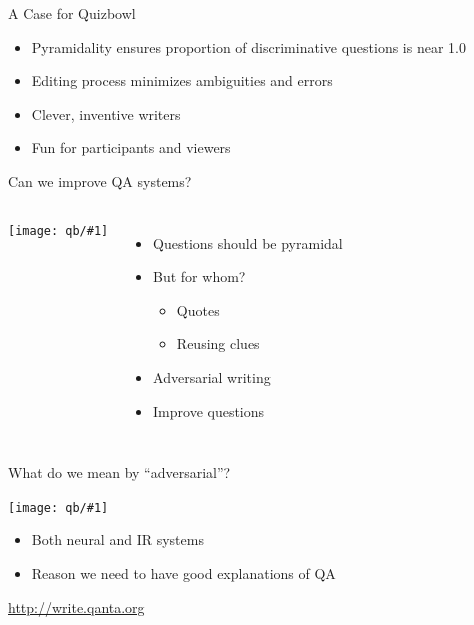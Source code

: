 \documentclass[xcolor=dvipsnames,xcolor=table]{beamer}
\newcommand{\fsi}[2]{
\begin{frame}[plain]
\vspace*{-1pt}
\makebox[\linewidth]{\texttt{[image: \#1]}}
\begin{center}
#2
\end{center}
\end{frame}
}
\newcommand{\gfxq}[2]{
\begin{center}
	\texttt{[image: qb/\#1]}
\end{center}
}
\begin{document}
\begin{frame}{A Case for Quizbowl}

  \begin{itemize}
    \item Pyramidality ensures proportion of discriminative questions is near 1.0
    \item Editing process minimizes ambiguities and errors
    \item Clever, inventive writers
    \item Fun for participants and viewers
  \end{itemize}
\end{frame}


\fsi{qb/jennings_handshake}{}

\begin{frame}{Can we improve QA systems?}

\begin{columns}
     \gfxq{trick/pyramid}{.9}
     \begin{itemize}
       \item Questions should be pyramidal
       \item But for whom?
         \begin{itemize}
           \item Quotes
           \item Reusing clues
         \end{itemize}
         \item Adversarial writing
         \item Improve questions
     \end{itemize}
\end{columns}
\end{frame}

\begin{frame}{What do we mean by ``adversarial''?}

  \gfxq{trick/flow_chart_horizontal_label}{1.0}

  \begin{itemize}
    \item Both neural and IR systems
      \pause
    \item Reason we need to have good explanations of QA
  \end{itemize}

\end{frame}

\fsi{qb/trick/brahms_0}{\href{http://write.qanta.org}{http://write.qanta.org}}
\fsi{qb/trick/brahms_1}{}
\fsi{qb/trick/brahms_2}{}
\fsi{qb/trick/brahms_3}{}
\fsi{qb/trick/brahms_4}{}
\fsi{qb/trick/brahms_5}{}
\end{document}
